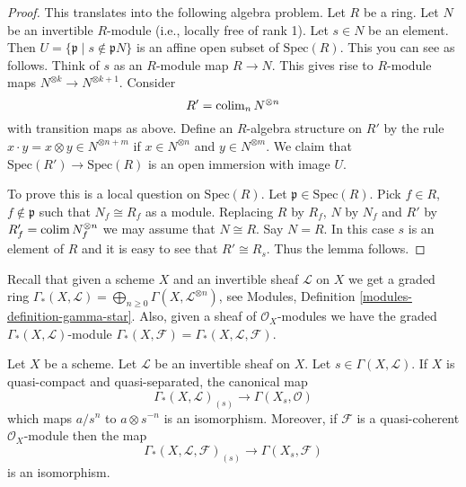 \begin{proof}
This translates into the following algebra problem.
Let $R$ be a ring. Let $N$ be an invertible $R$-module
(i.e., locally free of rank 1). Let $s \in N$ be an element.
Then $U = \{\mathfrak p \mid s \not \in \mathfrak p N\}$ is
an affine open subset of $\text{Spec}(R)$. This you can see
as follows. Think of $s$ as an $R$-module map $R \to N$.
This gives rise to $R$-module maps $N^{\otimes k} \to N^{\otimes k + 1}$.
Consider
$$
R' = \mathop{\rm colim}\nolimits_n N^{\otimes n}
$$
with transition maps as above. Define an $R$-algebra structure on $R'$ by
the rule $x \cdot y = x \otimes y \in N^{\otimes n + m}$
if $x \in N^{\otimes n}$ and $y \in N^{\otimes m}$. We claim that
$\text{Spec}(R') \to \text{Spec}(R)$ is an open immersion with
image $U$.

\medskip\noindent
To prove this is a local question on $\text{Spec}(R)$.
Let $\mathfrak p \in \text{Spec}(R)$. Pick $f \in R$,
$f \not \in \mathfrak p$ such that $N_f \cong R_f$ as a module.
Replacing $R$ by $R_f$, $N$ by $N_f$ and $R'$ by
$R'_f = \mathop{\rm colim}\nolimits N_f^{\otimes n}$ we may assume that $N \cong R$.
Say $N = R$. In this case $s$ is an element of $R$ and it is
easy to see that $R' \cong R_s$. Thus the lemma follows.
\end{proof}

\noindent
Recall that given a scheme $X$ and an invertible sheaf $\mathcal{L}$
on $X$ we get a graded ring
$\Gamma_*(X, \mathcal{L}) =
\bigoplus_{n \geq 0} \Gamma(X, \mathcal{L}^{\otimes n})$,
see Modules, Definition \ref{modules-definition-gamma-star}.
Also, given a sheaf of $\mathcal{O}_X$-modules we have the
graded $\Gamma_*(X, \mathcal{L})$-module
$\Gamma_*(X, \mathcal{F}) = \Gamma_*(X, \mathcal{L}, \mathcal{F})$.

\begin{lemma}
\label{lemma-invert-s-sections}
Let $X$ be a scheme. Let $\mathcal{L}$ be an invertible sheaf on $X$.
Let $s \in \Gamma(X, \mathcal{L})$.
If $X$ is quasi-compact and quasi-separated, the canonical map
$$
\Gamma_*(X, \mathcal{L})_{(s)}
\longrightarrow
\Gamma(X_s, \mathcal{O})
$$
which maps $a/s^n$ to $a \otimes s^{-n}$ is an isomorphism.
Moreover, if $\mathcal{F}$ is a quasi-coherent $\mathcal{O}_X$-module
then the map
$$
\Gamma_*(X, \mathcal{L}, \mathcal{F})_{(s)}
\longrightarrow
\Gamma(X_s, \mathcal{F})
$$
is an isomorphism.
\end{lemma}

